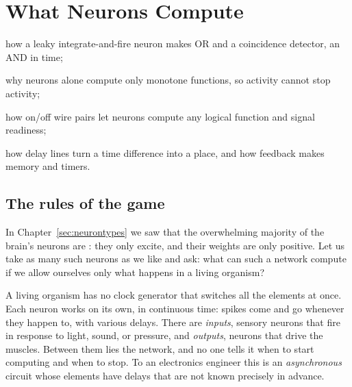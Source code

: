 \chapter{What  Neurons Compute}
\label{sec:glutcomputer}
\begin{chaptergoals}
\item how a leaky integrate-and-fire neuron makes OR and a coincidence detector, an AND in time;
\item why  neurons alone compute only monotone functions, so activity cannot stop activity;
\item how on/off wire pairs let  neurons compute any logical function and signal readiness;
\item how delay lines turn a time difference into a place, and how feedback makes memory and timers.
\end{chaptergoals}

\section{The rules of the game}

In Chapter~\ref{sec:neurontypes} we saw that the overwhelming majority of the brain's neurons are : they only excite, and their weights are only positive. Let us take as many such neurons as we like and ask: what can such a network compute if we allow ourselves only what happens in a living organism?

A living organism has no clock generator that switches all the elements at once. Each neuron works on its own, in continuous time: spikes come and go whenever they happen to, with various delays. There are \emph{inputs}, sensory neurons that fire in response to light, sound, or pressure, and \emph{outputs}, neurons that drive the muscles. Between them lies the network, and no one tells it when to start computing and when to stop. To an electronics engineer this is an \emph{asynchronous} circuit whose elements have delays that are not known precisely in advance.

